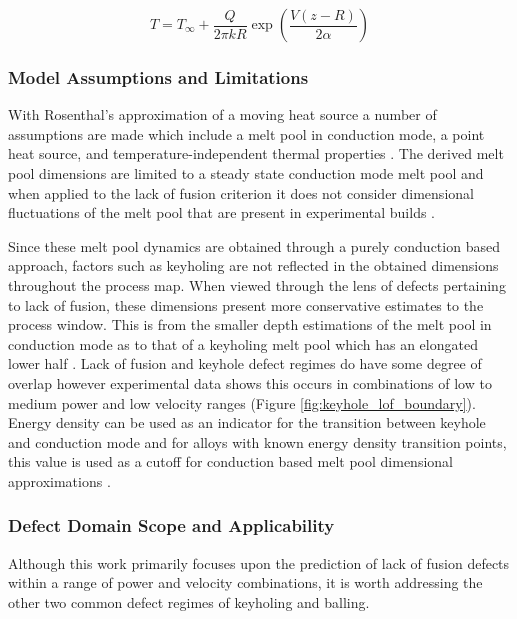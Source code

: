 \begin{equation}
T = T_\infty + \frac{Q}{2 \pi k R} \exp\left( \frac{V(z - R)}{2\alpha} \right)
\label{eq:rosenthal}
\end{equation}


\subsubsection{Model Assumptions and Limitations}

With Rosenthal's approximation of a moving heat source a number of assumptions
are made which include a melt pool in conduction mode, a point heat source, and
temperature-independent thermal properties \cite{tang_prediction_2017,
rosenthal_theory_2022}. The derived melt pool dimensions are limited to a steady
state conduction mode melt pool and when applied to the lack of fusion criterion
it does not consider dimensional fluctuations of the melt pool that are present
in experimental builds \cite{li_laser_2023}. 

Since these melt pool dynamics are obtained through a purely conduction based
approach, factors such as keyholing are not reflected in the obtained dimensions
throughout the process map. When viewed through the lens of defects pertaining
to lack of fusion, these dimensions present more conservative estimates to the
process window. This is from the smaller depth estimations of the melt pool in
conduction mode as to that of a keyholing melt pool which has an elongated lower
half \cite{tapia_gaussian_2018, gordon_defect_2020, bellini_additive_2021}. Lack
of fusion and keyhole defect regimes do have some degree of overlap however
experimental data shows this occurs in combinations of low to medium power and
low velocity ranges (Figure \ref{fig:keyhole_lof_boundary}). Energy density can
be used as an indicator for the transition between keyhole and conduction mode
and for alloys with known energy density transition points, this value is used
as a cutoff for conduction based melt pool dimensional approximations
\cite{bellini_additive_2021}.

\subsubsection{Defect Domain Scope and Applicability}
Although this work primarily focuses upon the prediction of lack of fusion
defects within a range of power and velocity combinations, it is worth
addressing the other two common defect regimes of keyholing and balling.

